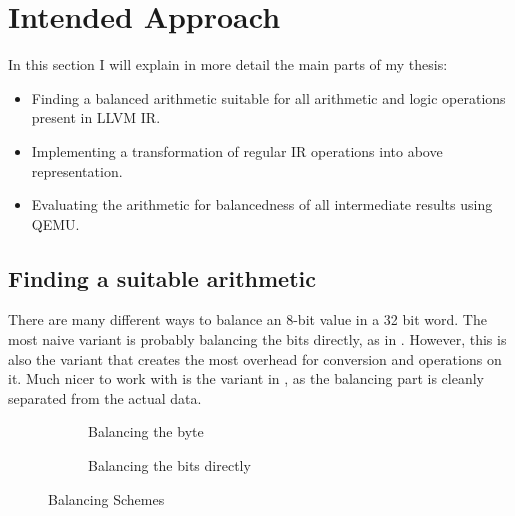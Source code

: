 \documentclass{article}
\newcommand{\qemu}{QEMU}
\newcommand{\llvm}{LLVM}
\begin{document}
\section{Intended Approach}
\label{sec:methodology}
In this section I will explain in more detail the main parts of my thesis:
\begin{itemize}
\item Finding a balanced arithmetic suitable for all arithmetic and logic operations present in \llvm{} IR.
\item Implementing a transformation of regular IR operations into above representation.
\item Evaluating the arithmetic for balancedness of all intermediate results using \qemu{}.
\end{itemize}

\subsection{Finding a suitable arithmetic}
There are many different ways to balance an 8-bit value in a 32 bit word.
The most naive variant is probably balancing the bits directly, as in .
However, this is also the variant that creates the most overhead for conversion and operations on it.
Much nicer to work with is the variant in , as the balancing part is cleanly separated from the actual data.


\begin{figure}[h]
  \centering
  \begin{subfigure}{.49\linewidth}
    \centering
    \caption{Balancing the byte}
    \label{fig:byte}
  \end{subfigure}
  \begin{subfigure}{.49\linewidth}
    \centering
    \caption{Balancing the bits directly}
    \label{fig:bit}
  \end{subfigure}
  \caption{Balancing Schemes}
  \label{fig:schemes}
\end{figure}
\end{document}
